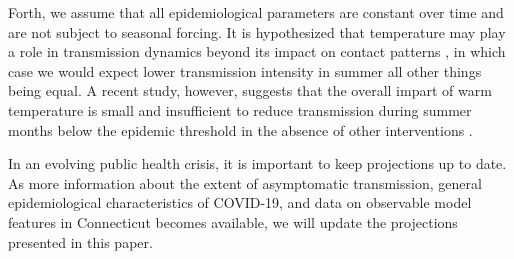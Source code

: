 \documentclass[11pt]{article}
\begin{document}
Forth, we assume that all epidemiological parameters are constant over time and are not subject to seasonal forcing. It is hypothesized that temperature may play a role in transmission dynamics beyond its impact on contact patterns \citep{kissler2020projecting}, in which case we would expect lower transmission intensity in summer all other things being equal. A recent study, however, suggests that the overall impart of warm temperature is small and insufficient to reduce transmission during summer months below the epidemic threshold in the absence of other interventions \citep{xu2020modest}.

In an evolving public health crisis, it is important to keep projections up to date. As more information about the extent of asymptomatic transmission, general epidemiological characteristics of COVID-19, and data on observable model features in Connecticut becomes available, we will update the projections presented in this paper.








\end{document}
